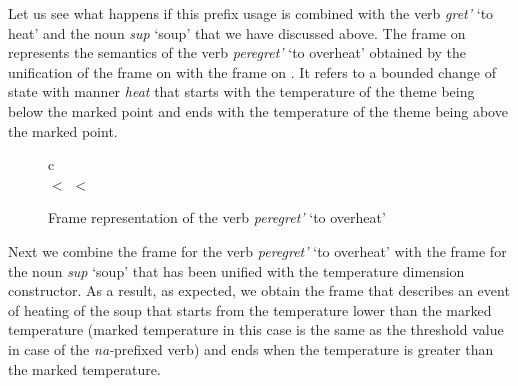 Let us see what happens if this prefix usage is combined with the verb \textit{gret'} `to heat' and the noun \textit{sup} `soup' that we have discussed above. The frame on  represents the semantics of the verb \textit{peregret'} `to overheat' obtained by the unification of the frame on  with the frame on . It refers to a bounded change of state with manner \textit{heat} that starts with the temperature of the theme being below the marked point and ends with the temperature of the theme being above the marked point.

\begin{figure}
\begin{center}
\begin{tabular}{c}
\\
 $<$  $<$ 
\end{tabular}
\end{center}
\caption{Frame representation of the verb \textit{peregret'} `to overheat' \label{frame:pere:gret}}
\end{figure}

Next we combine the frame for the verb \textit{peregret'} `to overheat' with the frame for the noun \textit{sup} `soup' that has been unified with the temperature dimension constructor. As a result, as expected, we obtain the frame that describes an event of heating of the soup that starts from the temperature lower than the marked temperature (marked temperature in this case is the same as the threshold value in case of the \textit{na-}prefixed verb) and ends when the temperature is greater than the marked temperature.

